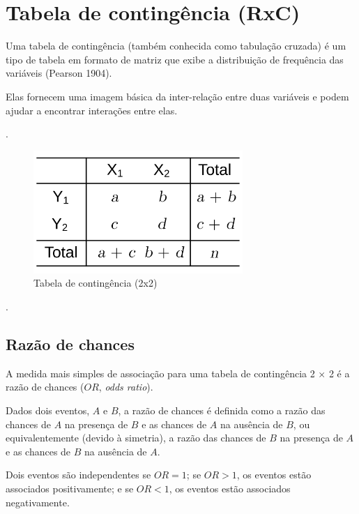 \documentclass[
]{book}
\begin{document}
\hypertarget{tabela-de-continguxeancia-rxc}{%
\section{Tabela de contingência (RxC)}\label{tabela-de-continguxeancia-rxc}}

Uma tabela de contingência (também conhecida como tabulação cruzada) é um tipo de tabela em formato de matriz que exibe a distribuição de frequência das variáveis (Pearson 1904).

Elas fornecem uma imagem básica da inter-relação entre duas variáveis e podem ajudar a encontrar interações entre elas.

.\linebreak

\begin{figure}

{\centering \includegraphics[width=300px]{figs/tabela_rc} 

}

\caption{Tabela de contingência (2x2)}\label{fig:tabelarc}
\end{figure}

.\linebreak

\hypertarget{razuxe3o-de-chances}{%
\subsection{Razão de chances}\label{razuxe3o-de-chances}}

A medida mais simples de associação para uma tabela de contingência 2 × 2 é a razão de chances (\(OR\), \emph{odds ratio}).

Dados dois eventos, \(A\) e \(B\), a razão de chances é definida como a razão das chances de \(A\) na presença de \(B\) e as chances de \(A\) na ausência de \(B\), ou equivalentemente (devido à simetria), a razão das chances de \(B\) na presença de \(A\) e as chances de \(B\) na ausência de \(A\).

Dois eventos são independentes se \(OR=1\); se \(OR>1\), os eventos estão associados positivamente; e se \(OR<1\), os eventos estão associados negativamente.
\end{document}
